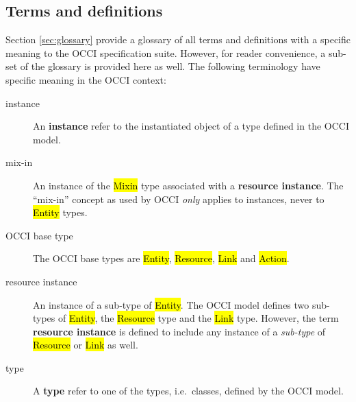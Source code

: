 \documentclass[10pt,a4paper,british]{article}
\begin{document}
\subsection{Terms and definitions}
Section \ref{sec:glossary} provide a glossary of all terms and definitions with
a specific meaning to the OCCI specification suite. However, for reader
convenience, a sub-set of the glossary is provided here as well. The following
terminology have specific meaning in the OCCI context:
\begin{description}
\item[instance] An {\bf instance} refer to the instantiated object of a type
 defined in the OCCI model.
\item[mix-in] An instance of the \hl{Mixin} type associated with a {\bf resource
 instance}. The ``mix-in'' concept as used by OCCI {\em only} applies to
 instances, never to \hl{Entity} types.
\item[OCCI base type] The OCCI base types are \hl{Entity}, \hl{Resource},
 \hl{Link} and \hl{Action}.
\item[resource instance] An instance of a sub-type of \hl{Entity}. The OCCI
 model defines two sub-types of \hl{Entity}, the \hl{Resource} type and the
 \hl{Link} type.  However, the term {\bf resource instance} is defined to
 include any instance of a {\em sub-type} of \hl{Resource} or \hl{Link} as
 well.
\item[type] A {\bf type} refer to one of the types, i.e.~classes, defined by
 the OCCI model.
\end{description}
\end{document}
